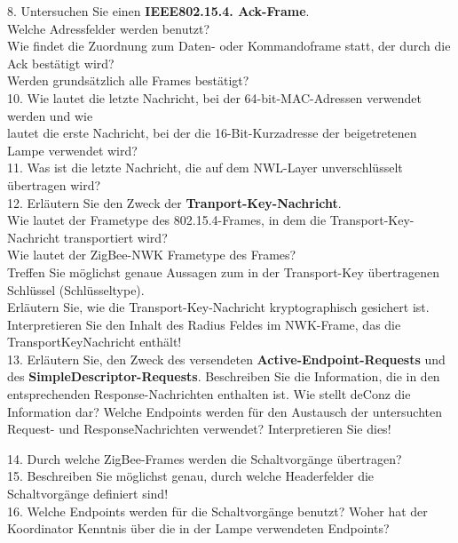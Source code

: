 \begin{Fragen}
    8. Untersuchen Sie einen \textbf{IEEE802.15.4. Ack-Frame}.\\
    Welche Adressfelder werden benutzt? \\
    Wie findet die Zuordnung zum Daten- oder Kommandoframe statt, der durch die Ack bestätigt wird? \\
    Werden grundsätzlich alle Frames bestätigt?\\
    
    10. Wie lautet die letzte Nachricht, bei der 64-bit-MAC-Adressen verwendet werden und wie\\
     lautet die erste Nachricht, bei der die 16-Bit-Kurzadresse der beigetretenen Lampe verwendet wird?\\
    
    11. Was ist die letzte Nachricht, die auf dem NWL-Layer unverschlüsselt übertragen wird?\\
    
    12. Erläutern Sie den Zweck der \textbf{Tranport-Key-Nachricht}.\\
     Wie lautet der Frametype des 802.15.4-Frames, in dem die Transport-Key-Nachricht transportiert wird? \\
     Wie lautet der ZigBee-NWK Frametype des Frames?\\
     Treffen Sie möglichst genaue Aussagen zum in der Transport-Key übertragenen Schlüssel (Schlüsseltype). \\
     Erläutern Sie, wie die Transport-Key-Nachricht kryptographisch gesichert ist.\\
     Interpretieren Sie den Inhalt des Radius Feldes im NWK-Frame, das die TransportKeyNachricht enthält!\\
    
    13. Erläutern Sie, den Zweck des versendeten \textbf{Active-Endpoint-Requests} und des \textbf{SimpleDescriptor-Requests}.
     Beschreiben Sie die Information, die in den entsprechenden Response-Nachrichten enthalten ist. 
     Wie stellt deConz die Information dar?
     Welche Endpoints werden für den Austausch der untersuchten Request- und ResponseNachrichten verwendet? Interpretieren Sie dies!

    
    14. Durch welche ZigBee-Frames werden die Schaltvorgänge übertragen? \\
    
    15. Beschreiben Sie möglichst genau, durch welche Headerfelder die Schaltvorgänge definiert sind! \\
        
    16. Welche Endpoints werden für die Schaltvorgänge benutzt? Woher hat der Koordinator Kenntnis über die in der Lampe verwendeten Endpoints? \\
    \end{Fragen}
